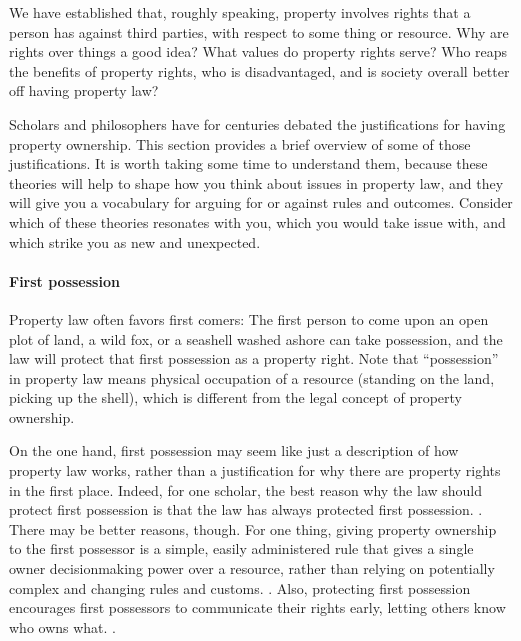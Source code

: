 
We have established that, roughly speaking, property involves rights that a
person has against third parties, with respect to some thing or resource. Why
are rights over things a good idea? What values do property rights serve? Who
reaps the benefits of property rights, who is disadvantaged, and is society
overall better off having property law?

Scholars and philosophers have for centuries debated the justifications for
having property ownership. This section provides a brief overview of some of
those justifications. It is worth taking some time to understand them, because
these theories will help to shape how you think about issues in property law,
and they will give you a vocabulary for arguing for or against rules and
outcomes. Consider which of these theories resonates with you, which you would
take issue with, and which strike you as new and unexpected.





\paragraph{First possession} Property law often favors first comers: The first
person to come upon an open plot of land, a wild fox, or a seashell washed
ashore can take possession, and the law will protect that first possession as a
property right. Note that ``possession'' in property law means physical
occupation of a resource (standing on the land, picking up the shell), which is
different from the legal concept of property ownership.

On the one hand, first possession may seem like just a description of how
property law works, rather than a justification for why there are property
rights in the first place. Indeed, for one scholar, the best reason why the law
should protect first possession is that the law has always protected first
possession. . There may be
better reasons, though. For one thing, giving property ownership to the first
possessor is a simple, easily administered rule that gives a single owner
decisionmaking power over a resource, rather than relying on potentially complex
and changing rules and customs. . Also, protecting first possession encourages first possessors to
communicate their rights early, letting others know who owns what. .


